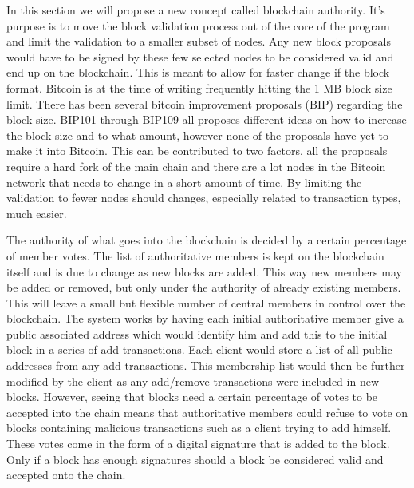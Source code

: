 \documentclass[12pt]{article}
\begin{document}
In this section we will propose a new concept called blockchain authority. It's purpose is to move the block validation process out of the core of the program and limit the validation to a smaller subset of nodes. Any new block proposals would have to be signed by these few selected nodes to be considered valid and end up on the blockchain. This is meant to allow for faster change if the block format. Bitcoin is at the time of writing frequently hitting the 1 MB block size limit. There has been several bitcoin improvement proposals (BIP) regarding the block size. BIP101 through BIP109\cite{bips} all proposes different ideas on how to increase the block size and to what amount, however none of the proposals have yet to make it into Bitcoin. This can be contributed to two factors, all the proposals require a hard fork of the main chain and there are a lot nodes in the Bitcoin network that needs to change in a short amount of time. By limiting the validation to fewer nodes should changes, especially related to transaction types, much easier.

The authority of what goes into the blockchain is decided by a certain percentage of member votes. The list of authoritative members is kept on the blockchain itself and is due to change as new blocks are added. This way new members may be added or removed, but only under the authority of already existing members. This will leave a small but flexible number of central members in control over the blockchain. The system works by having each initial authoritative member give a public associated address which would identify him and add this to the initial block in a series of add transactions. Each client would store a list of all public addresses from any add transactions. This membership list would then be further modified by the client as any add/remove transactions were included in new blocks. However, seeing that blocks need a certain percentage of votes to be accepted into the chain means that authoritative members could refuse to vote on blocks containing malicious transactions such as a client trying to add himself. These votes come in the form of a digital signature that is added to the block. Only if a block has enough signatures should a block be considered valid and accepted onto the chain. 

\end{document}
